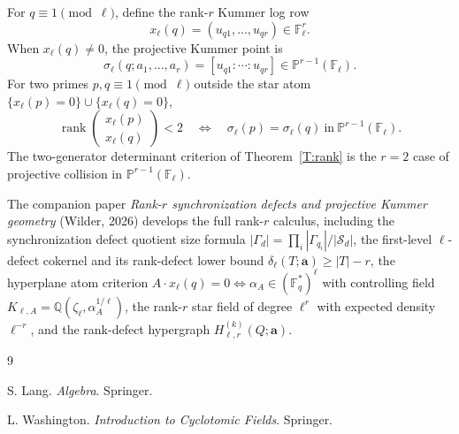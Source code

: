 \documentclass[11pt]{article}
\newcommand{\Q}{\mathbb Q}
\newcommand{\F}{\mathbb F}
\newcommand{\1}{\mathbf 1}
\newcommand{\rank}{\operatorname{rank}}
\begin{document}
For \(q\equiv1\pmod\ell\), define the rank-\(r\) Kummer log row
\[
x_\ell(q)=(u_{q1},\ldots,u_{qr})\in\F_\ell^r.
\]
When \(x_\ell(q)\ne0\), the projective Kummer point is
\[
\sigma_\ell(q;a_1,\ldots,a_r)=[u_{q1}:\cdots:u_{qr}]\in\mathbb P^{r-1}(\F_\ell).
\]
For two primes \(p,q\equiv1\pmod\ell\) outside the star atom \(\{x_\ell(p)=0\}\cup\{x_\ell(q)=0\}\),
\[
\rank
\begin{pmatrix}
x_\ell(p)\\
x_\ell(q)
\end{pmatrix}<2
\quad\Longleftrightarrow\quad
\sigma_\ell(p)=\sigma_\ell(q)\ \text{in}\ \mathbb P^{r-1}(\F_\ell).
\]
The two-generator determinant criterion of Theorem~\ref{T:rank} is the \(r=2\) case of projective collision in \(\mathbb P^{r-1}(\F_\ell)\).

The companion paper \emph{Rank-\(r\) synchronization defects and projective Kummer geometry} (Wilder, 2026) develops the full rank-\(r\) calculus, including the synchronization defect quotient size formula \(|\Gamma_d|=\prod_i|\Gamma_{q_i}|/|\mathcal S_d|\), the first-level \(\ell\)-defect cokernel and its rank-defect lower bound \(\delta_\ell(T;\mathbf a)\ge |T|-r\), the hyperplane atom criterion \(A\cdot x_\ell(q)=0\iff\alpha_A\in(\F_q^*)^\ell\) with controlling field \(K_{\ell,A}=\Q(\zeta_\ell,\alpha_A^{1/\ell})\), the rank-\(r\) star field of degree \(\ell^r\) with expected density \(\ell^{-r}\), and the rank-defect hypergraph \(H^{(k)}_{\ell,r}(Q;\mathbf a)\).


\begin{thebibliography}{9}

S. Lang.
\newblock \emph{Algebra}.
\newblock Springer.

L. Washington.
\newblock \emph{Introduction to Cyclotomic Fields}.
\newblock Springer.

\end{thebibliography}
\end{document}
